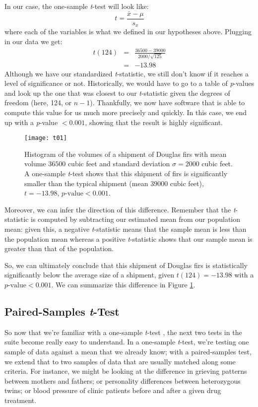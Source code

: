 In our case, the one-sample \textit{t}-test will look like:
\begin{equation}
t=\frac{\bar{x}-\mu}{s_x}
\end{equation}
where each of the variables is what we defined in our hypotheses above. Plugging in our data we get:
\begin{eqnarray*}
t(124)&=&\frac{36500-39000}{2000/\sqrt{125}} \\
&=& -13.98
\end{eqnarray*}
Although we have our standardized \textit{t}-statistic, we still don't know if it reaches a level of significance or not. Historically, we would have to go to a table of \textit{p}-values and look up the one that was closest to our \textit{t}-statistic given the degrees of freedom (here, 124, or $n-1$). Thankfully, we now have software that is able to compute this value for us much more precisely and quickly. In this case, we end up with a \textit{p}-value $< 0.001$, showing that the result is highly significant.

\begin{figure}[htp]
\texttt{[image: t01]}
\caption{Histogram of the volumes of a shipment of Douglas firs with mean volume $36500$ cubic feet and standard deviation $\sigma = 2000$ cubic feet. A one-sample \textit{t}-test shows that this shipment of firs is significantly smaller than the typical shipment (mean $39000$ cubic feet), $t=-13.98$, $p\text{-value}<0.001$.}
\label{fig:t01}
\end{figure}

Moreover, we can infer the direction of this difference. Remember that the \textit{t}-statistic is computed by subtracting our estimated mean from our population mean: given this, a negative \textit{t}-statistic means that the sample mean is less than the population mean whereas a positive \textit{t}-statistic shows that our sample mean is greater than that of the population.

So, we can ultimately conclude that this shipment of Douglas firs is statistically significantly below the average size of a shipment, given $t(124)=-13.98$ with a $p\text{-value} < 0.001$. We can summarize this difference in Figure \ref{fig:t01}.

\subsection{Paired-Samples \textit{t}-Test}

So now that we're familiar with a one-sample \textit{t}-test , the next two tests in the suite become really easy to understand. In a one-sample \textit{t}-test, we're testing one sample of data against a mean that we already know; with a paired-samples test, we extend that to two samples of data that are usually matched along some criteria. For instance, we might be looking at the difference in grieving patterns between mothers and fathers; or personality differences between heterozygous twins; or blood pressure of clinic patients before and after a given drug treatment.

